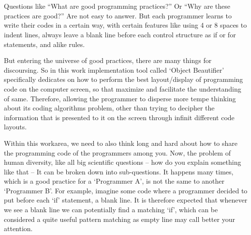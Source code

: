 

%
\cleardoublepage
{}


\chapter{}


\chooselang
{
    Questions like ``What are good programming practices?'' Or ``Why are these practices are good?''
    Are not easy to answer. But each programmer learns to write their codes in a certain way, with
    certain features like using 4 or 8 spaces to indent lines, always leave a blank line before each
    control structure as if or for statements, and alike rules. \cite{industrialApplication}

    But entering the universe of good practices, there are many things for discoursing. So in this
    work implementation tool called `Object Beautifier' specifically dedicates on how to perform
    the best layout/display of programming code on the computer screen, so that maximize and
    facilitate the understanding of same. Therefore, allowing the programmer to disperse more tempe
    thinking about its coding algorithms problem, other than trying to decipher the information that
    is presented to it on the screen through infinit different code layouts. \cite{programIndentation}

    Within this work\s area, we need to also think long and hard about how to share the programming
    code of the programmers among you. Now, the problem of human diversity, like all big scientific
    questions -- how do you explain something like that -- It can be broken down into sub-questions.
    It happens many times, which is a good practice for a `Programmer A', is not the same to another
    `Programmer B'. For example, imagine some code where a programmer decided to put before each
    `if' statement, a blank line. It is therefore expected that whenever we see a blank line we can
    potentially find a matching `if', which can be considered a quite useful pattern matching as
    empty line may call better your attention.

}
